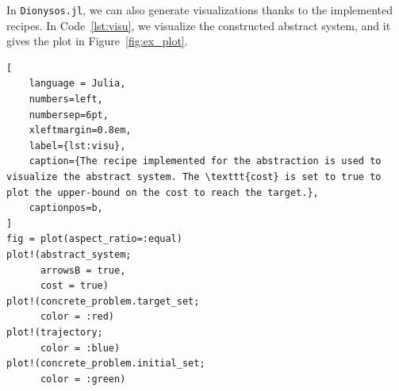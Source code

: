 \documentclass{juliacon}
\begin{document}
In \texttt{Dionysos.jl}, we can also generate visualizations thanks to the implemented recipes. In Code~\ref{lst:visu}, we visualize the constructed abstract system, and it gives the plot in Figure~\ref{fig:ex_plot}.
\begin{lstlisting}[
    language = Julia, 
    numbers=left, 
    numbersep=6pt, 
    xleftmargin=0.8em,
    label={lst:visu}, 
    caption={The recipe implemented for the abstraction is used to visualize the abstract system. The \texttt{cost} is set to true to plot the upper-bound on the cost to reach the target.},
    captionpos=b,
]
fig = plot(aspect_ratio=:equal)
plot!(abstract_system; 
      arrowsB = true, 
      cost = true)
plot!(concrete_problem.target_set; 
      color = :red)
plot!(trajectory; 
      color = :blue)
plot!(concrete_problem.initial_set; 
      color = :green)
\end{lstlisting}
\color{black}
\end{document}
